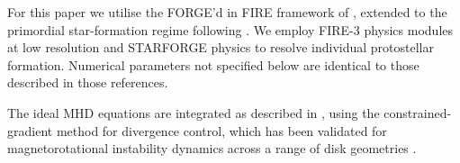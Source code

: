 

For this paper we utilise the FORGE'd in FIRE framework of
\citet{FORGE_d_in_FIRE_Hopkin_2023}, extended to the primordial
star-formation regime following \citet{meziani26}.
We employ FIRE-3 \citep{FIRE_3_Updated_Hopkin} physics modules at
low resolution and STARFORGE \citep{STARFORGE_Towa_Grudic_2021}
physics to resolve individual protostellar formation.
Numerical parameters not specified below are identical to those
described in those references.



The ideal MHD equations are integrated as described in
\citet{Hopkins_Raives_2015}, using the constrained-gradient method
\citep{Hopkins_2016_CG_MHD} for divergence control, which has been
validated for magnetorotational instability dynamics across a range
of disk geometries \citep{FORGE_d_in_FIRE_Hopkin_2023}.

